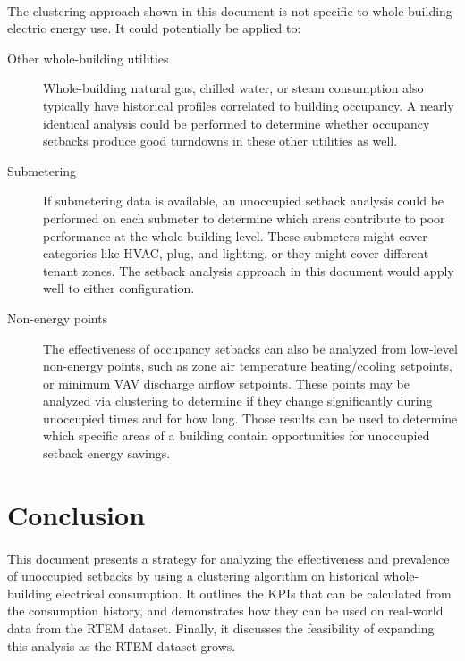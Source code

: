 \documentclass[a4paper]{article}
\begin{document}
\paragraph{}
The clustering approach shown in this document is not specific to whole-building electric energy use. It could potentially be applied to:
\begin{description}
\item[Other whole-building utilities]{Whole-building natural gas, chilled water, or steam consumption also typically have historical profiles correlated to building occupancy. A nearly identical analysis could be performed to determine whether occupancy setbacks produce good turndowns in these other utilities as well.}
\item[Submetering]{If submetering data is available, an unoccupied setback analysis could be performed on each submeter to determine which areas contribute to poor performance at the whole building level. These submeters might cover categories like HVAC, plug, and lighting, or they might cover different tenant zones. The setback analysis approach in this document would apply well to either configuration.}
\item[Non-energy points]{The effectiveness of occupancy setbacks can also be analyzed from low-level non-energy points, such as zone air temperature heating/cooling setpoints, or minimum VAV discharge airflow setpoints. These points may be analyzed via clustering to determine if they change significantly during unoccupied times and for how long. Those results can be used to determine which specific areas of a building contain opportunities for unoccupied setback energy savings.}
\end{description}

\section{Conclusion}

\paragraph{}
This document presents a strategy for analyzing the effectiveness and prevalence of unoccupied setbacks by using a clustering algorithm on historical whole-building electrical consumption. It outlines the KPIs that can be calculated from the consumption history, and demonstrates how they can be used on real-world data from the RTEM dataset. Finally, it discusses the feasibility of expanding this analysis as the RTEM dataset grows.
\end{document}
